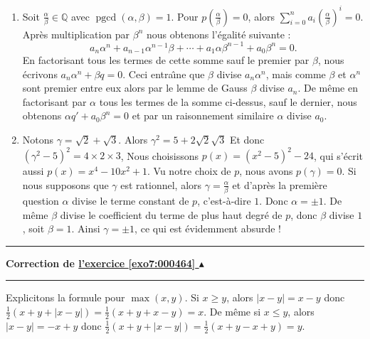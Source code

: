 \documentclass[11pt,a4paper]{article}
\newcommand{\Qq}{\mathbb{Q}} \newcommand{\Q}{\mathbb{Q}}
\newcommand{\pgcd}{\mathop{\mathrm{pgcd}}\nolimits}
\newcounter{exo}
\newcommand{\correction}[1]{\hypertarget{cor7:#1}{}\label{cor7:#1}{\bf Correction de \hyperlink{exo7:#1}{l'exercice \ref{exo7:#1} $\blacktriangle$}}\vspace{1mm}\hrule\vspace{1mm}}
\newcommand{\fincorrection}{\vspace{1mm}\hrule\vspace*{7mm}}
\begin{document}
\begin{enumerate}
\item
  Soit $\frac \alpha \beta \in \Qq$ avec $\pgcd(\alpha,\beta) = 1$.
Pour $p(\frac \alpha \beta) = 0$, alors $\sum_{i=0}^n {a_i
\left(\frac \alpha \beta \right)^i} = 0$. Apr\`es multiplication par
$\beta^n$ nous obtenons l'\'egalit\'e suivante :
$$
a_n\alpha^n+a_{n-1}\alpha^{n-1}\beta + \cdots +
a_1\alpha\beta^{n-1}+a_0\beta^n = 0.$$ 
En factorisant tous les termes de cette somme sauf le premier par $\beta$, nous \'ecrivons
$a_n\alpha^n+\beta q=0$. Ceci entra\^{\i}ne que $\beta$ divise
$a_n\alpha^n$, mais comme $\beta$ et $\alpha^n$ sont premier entre
eux alors par le lemme de Gauss
$\beta$ divise $a_n$. De m\^eme en factorisant par $\alpha$ tous les termes
de la somme ci-dessus, sauf le dernier,  nous obtenons $\alpha q'
+a_0\beta^n = 0$ et par un raisonnement similaire $\alpha$ divise
$a_0$.
  \item  Notons $\gamma = \sqrt 2+\sqrt 3$.
Alors $\gamma^2 = 5 +2\sqrt 2 \sqrt 3$ Et donc
$\left(\gamma^2-5\right)^2= 4\times 2 \times 3$, Nous choisissons
$p(x) = (x^2-5)^2-24$, qui s'\'ecrit aussi $p(x)=x^4-10x^2+1$. Vu
notre choix de $p$, nous avons $p(\gamma)=0$. Si nous supposons
que $\gamma$ est rationnel, alors $\gamma = \frac \alpha \beta$ et
d'apr\`es la premi\`ere question $\alpha$ divise le terme constant de
$p$, c'est-\`a-dire $1$. Donc $\alpha=\pm 1$. De m\^eme $\beta$
divise le coefficient du terme de plus haut degr\'e de $p$, donc
$\beta$ divise $1$, soit $\beta = 1$. Ainsi $\gamma = \pm 1$, ce
qui est \'evidemment absurde !
\end{enumerate}
\fincorrection
\correction{000464}
Explicitons la formule pour $\max(x,y)$. Si $x\geqslant y$, alors $|x-y|
= x-y$ donc $\frac12(x+y+|x-y|) = \frac12(x+y+x-y) = x$. De m\^eme
si $x \leqslant y$, alors $|x-y| = -x + y$ donc $\frac12(x+y+|x-y|) =
\frac12(x+y-x+y) = y$.
\end{document}
